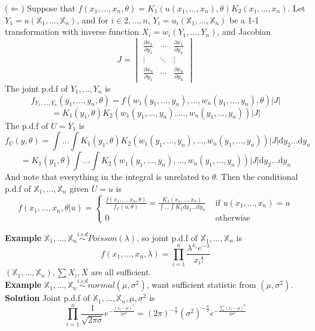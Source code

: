 ($\Leftarrow$) Suppose that $f(x_1, ..., x_n, \theta) = K_1(u(x_1, ..., x_n), \theta)K_2(x_1, ..., x_n)$. Let $Y_1 = u(\mathbb{X}_1, ..., \mathbb{X}_n)$, and for $i \in 2, ..., n$,  $Y_i = u_i(\mathbb{X}_1, ..., \mathbb{X}_n)$ be a 1-1 transformation with inverse function $X_i = w_i(Y_1, ..., Y_n)$, and Jacobian
$$J = \begin{vmatrix}
\frac{\partial x_1}{\partial y_1} & \cdots & \frac{\partial x_1}{\partial y_n}\\
\vdots & \ddots & \vdots\\
\frac{\partial x_n}{\partial y_1} & \cdots & \frac{\partial x_n}{\partial y_n}
\end{vmatrix}$$
The joint p.d.f of $Y_1, ..., Y_n$ is
$$f_{Y_1, ..., Y_n}(y_1, ..., y_n, \theta) = f( w_1(y_1, ..., y_n), ..., w_n(y_1, ..., y_n), \theta )|J|$$
$$= K_1(y_1, \theta)K_2(w_1(y_1, ..., y_n), ..., w_n(y_1, ..., y_n) )|J|$$
The p.d.f of $U = Y_1$ is
$$f_U(y, \theta) = \int...\int K_1(y_1, \theta)K_2(w_1(y_1, ..., y_n), ..., w_n(y_1, ..., y_n) )|J|\mathrm{d}y_2...\mathrm{d}y_n$$
$$= K_1(y_1, \theta) \int...\int K_2(w_1(y_1, ..., y_n), ..., w_n(y_1, ..., y_n) )|J|\mathrm{d}y_2...\mathrm{d}y_n$$
And note that everything in the integral is unrelated to $\theta$. Then the conditional p.d.f of $\mathbb{X}_1, ..., \mathbb{X}_n$ given $U=u$ is
$$f(x_1, ..., x_n, \theta | u) = 
\begin{cases}
\frac{f(x_1, ..., x_n, \theta)}{f_U(u, \theta)} = \frac{K_2(x_1, ..., x_n)}{\int...\int K_2\mathrm{d}y_2...\mathrm{d}y_n} & \text{ if } u(x_1, ..., x_n) = u\\
0 & \text{ otherwise }
\end{cases}$$ 

\textbf{Example} $\mathbb{X}_1, ..., \mathbb{X}_n \overset{i.i.d}{\sim} Poisson(\lambda)$, so joint p.d.f of $\mathbb{X}_1, ..., \mathbb{X}_n$ is
$$f(x_1, ..., x_n, \lambda) = \prod_{i=1}^n \frac{\lambda^{x_i} e^{-\lambda}}{x_i!}$$
$(\mathbb{X}_1, ..., \mathbb{X}_n), \sum X_i, \bar{X}$ are all sufficient.\\

\textbf{Example} $\mathbb{X}_1, ..., \mathbb{X}_n \overset{i.i.d}{\sim} normal(\mu, \sigma^2)$, want sufficient statistic from $(\mu, \sigma^2)$.\\

\textbf{Solution} Joint p.d.f of $\mathbb{X}_1, ..., \mathbb{X}_n, \mu, \sigma^2$ is
$$\prod_{i=1}^n \frac{1}{\sqrt{2\pi\sigma}}e^{-\frac{(x_i-\mu)^2}{2\sigma^2}} = (2\pi)^{-\frac{n}{2}}(\sigma^2)^{-\frac{n}{2}}e^{-\frac{\sum(x_i-\mu)^2}{2\sigma^2}}$$

